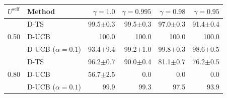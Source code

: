 \begin{tabular}{llrrrr}
\toprule
$U^{\mathrm{self}}$ & Method & $\gamma=1.0$ & $\gamma=0.995$ & $\gamma=0.98$ & $\gamma=0.95$ \\
\midrule
\multirow{3}{*}{0.50} & D-TS & 99.5{\scriptsize$\pm$0.3} & 99.5{\scriptsize$\pm$0.3} & 97.0{\scriptsize$\pm$0.3} & 91.4{\scriptsize$\pm$0.4} \\
 & D-UCB & 100.0 & 100.0 & 100.0 & 100.0 \\
 & D-UCB ($\alpha{=}0.1$) & 93.4{\scriptsize$\pm$9.4} & 99.2{\scriptsize$\pm$1.0} & 99.8{\scriptsize$\pm$0.3} & 98.6{\scriptsize$\pm$0.5} \\
\midrule
\multirow{3}{*}{0.80} & D-TS & 96.2{\scriptsize$\pm$0.7} & 90.0{\scriptsize$\pm$0.4} & 81.1{\scriptsize$\pm$0.7} & 76.2{\scriptsize$\pm$0.5} \\
 & D-UCB & 56.7{\scriptsize$\pm$2.5} & 0.0 & 0.0 & 0.0 \\
 & D-UCB ($\alpha{=}0.1$) & 99.9 & 99.3 & 97.5 & 93.9 \\
\bottomrule
\end{tabular}
